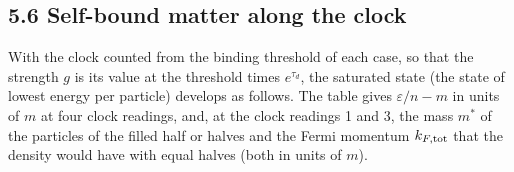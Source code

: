 \documentclass[
  10pt,
]{article}
\begin{document}
\hypertarget{self-bound-matter-along-the-clock}{%
\subsection{5.6 Self-bound matter along the
clock}\label{self-bound-matter-along-the-clock}}

With the clock counted from the binding threshold of each case, so that
the strength \(g\) is its value at the threshold times \(e^{\tau_d}\),
the saturated state (the state of lowest energy per particle) develops
as follows. The table gives \(\varepsilon/n-m\) in units of \(m\) at
four clock readings, and, at the clock readings 1 and 3, the mass
\(m^*\) of the particles of the filled half or halves and the Fermi
momentum \(k_{F,\rm tot}\) that the density would have with equal halves
(both in units of \(m\)).
\end{document}
